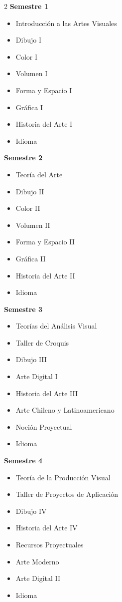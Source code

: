 \documentclass[12pt,a4paper]{article}
\begin{document}
	\begin{multicols}{2}
		\textbf{Semestre 1}
		\begin{itemize}
			\item Introducción a las Artes Visuales
			\item Dibujo I
			\item Color I
			\item Volumen I
			\item Forma y Espacio I
			\item Gráfica I
			\item Historia del Arte I
			\item Idioma
		\end{itemize}
		
		\textbf{Semestre 2}
		\begin{itemize}
			\item Teoría del Arte
			\item Dibujo II
			\item Color II
			\item Volumen II
			\item Forma y Espacio II
			\item Gráfica II
			\item Historia del Arte II
			\item Idioma
		\end{itemize}
		
		\textbf{Semestre 3}
		\begin{itemize}
			\item Teorías del Análisis Visual
			\item Taller de Croquis
			\item Dibujo III
			\item Arte Digital I
			\item Historia del Arte III
			\item Arte Chileno y Latinoamericano
			\item Noción Proyectual
			\item Idioma
		\end{itemize}
		
		\textbf{Semestre 4}
		\begin{itemize}
			\item Teoría de la Producción Visual
			\item Taller de Proyectos de Aplicación
			\item Dibujo IV
			\item Historia del Arte IV
			\item Recursos Proyectuales
			\item Arte Moderno
			\item Arte Digital II
			\item Idioma
		\end{itemize}
		

\end{multicols}
\end{document}
